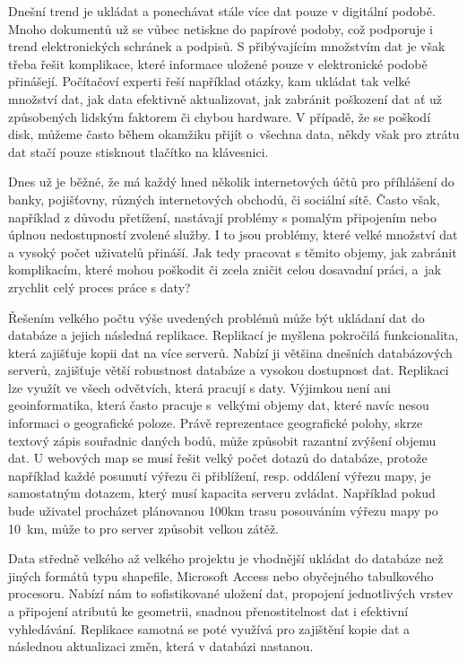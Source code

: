 Dnešní trend je ukládat a ponechávat stále více dat pouze v digitální podobě. Mnoho dokumentů už se vůbec netiskne do papírové podoby, což podporuje i trend elektronických schránek a podpisů. S přibývajícím množstvím dat je však třeba řešit komplikace, které informace uložené pouze v elektronické podobě přinášejí. Počítačoví experti řeší například otázky, kam ukládat tak velké množství dat, jak data efektivně aktualizovat, jak zabránit poškození dat ať už způsobených lidským faktorem či chybou hardware. V případě, že se poškodí disk, můžeme často během okamžiku přijít o~všechna data, někdy však pro ztrátu dat stačí pouze stisknout tlačítko na klávesnici.

Dnes už je běžné, že má každý hned několik internetových účtů pro příhlášení do banky, pojišťovny, různých internetových obchodů, či sociální sítě. Často však, například z důvodu přetížení, nastávají problémy s pomalým připojením nebo úplnou nedostupností zvolené služby. I to jsou problémy, které velké množství dat a vysoký počet uživatelů přináší. Jak tedy pracovat s těmito objemy, jak zabránit komplikacím, které mohou poškodit či zcela zničit celou dosavadní práci, a~jak zrychlit celý proces práce s daty? 

Řešením velkého počtu výše uvedených problémů může být ukládaní dat do databáze a jejich následná replikace. Replikací je myšlena pokročilá funkcionalita, která zajišťuje kopii dat na více serverů. Nabízí ji většina dnešních databázových serverů, zajišťuje větší robustnost databáze a vysokou dostupnost dat. Replikaci lze využít ve všech odvětvích, která pracují s daty. Výjimkou není ani geoinformatika, která často pracuje s~velkými objemy dat, které navíc nesou informaci o geografické poloze. Právě reprezentace geografické polohy, skrze textový zápis souřadnic daných bodů, může způsobit razantní zvýšení objemu dat. U webových map se musí řešit velký počet dotazů do databáze, protože například každé posunutí výřezu či přiblížení, resp. oddálení výřezu mapy, je samostatným dotazem, který musí kapacita serveru zvládat. Například pokud bude uživatel procházet plánovanou 100km trasu posouváním výřezu mapy po 10~km, může to pro server způsobit velkou zátěž.

Data středně velkého až velkého projektu je vhodnější ukládat do databáze než jiných formátů typu shapefile, Microsoft Access nebo obyčejného tabulkového procesoru. Nabízí nám to sofistikované uložení dat, propojení jednotlivých vrstev a připojení atributů ke geometrii, snadnou přenostitelnost dat i efektivní vyhledávání. Replikace samotná se poté využívá pro zajištění kopie dat a následnou aktualizaci změn, která v databázi nastanou. 


